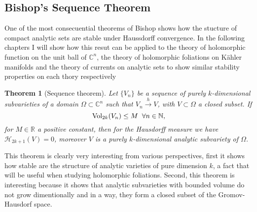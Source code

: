 \documentclass[12pt,twoside,a4paper]{report}
\newtheorem{theorem}{Theorem}[section]
\newcommand{\nat}{\ensuremath{ \mathbb N }}
\newcommand{\re}{\ensuremath{\mathbb R }}
\newcommand{\con}{\ensuremath{\mathbb{C}^n}}
\begin{document}
\subsection{Bishop's Sequence Theorem}
\noindent One of the most consecuential theorems of Bishop shows how the stucture of compact analytic sets are stable under Haussdorff convergence. In the following chapters I will show how this resut can be applied to the theory of holomorphic function on the unit ball of $\con$, the theory of holomorphic foliations on Kähler manifolds and the theory of currents on analytic sets to show similar stability properties on each thory respectively

\begin{theorem}[Sequence theorem] \label{bishop sequence}
  Let $\{V_n\}$ be a sequence of purely $k$-dimensional subvarieties of a domain $\Omega\subset\con$ such that $V_n\overset{h}\rightarrow V$, with $V\subset\Omega$ a closed subset. If
  \[
    \textrm{Vol}_{2k}(V_n)\leq M \hspace*{0.2cm}\forall n\in\nat,
  \]
  for $M\in\re$ a positive constant, then for the Hausdorff measure we have $\mathcal{H}_{2k+1}(V)=0$, moreover $V$ is a purely $k$-dimensional analytic subvariety of $\Omega$.
\end{theorem}

This theorem is clearly very interesting from various perspectives, first it shows how stable are the structure of analytic varieties of pure dimension $k$, a fact that will be useful when studying holomorphic foliations. Second, this theorem is interesting because it shows that analytic subvarieties with bounded volume do not grow dimentionally and in a way, they form a closed subset of the Gromov-Hausdorf space.
\end{document}
